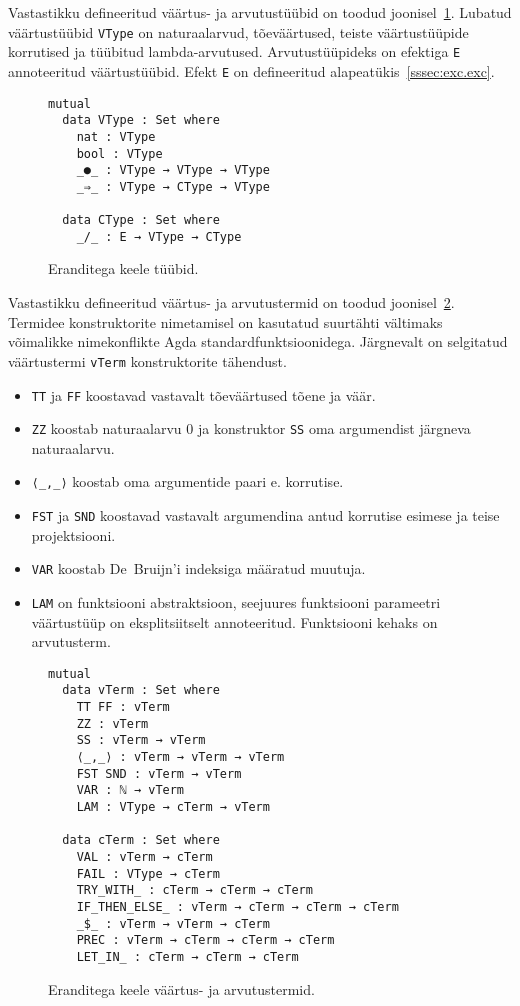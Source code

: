\documentclass[a4paper,12pt]{article}
\begin{document}
Vastastikku defineeritud väärtus- ja arvutustüübid on toodud joonisel~\ref{fig:exc.types}.
Lubatud väärtustüübid {\tt VType} on naturaalarvud, tõeväärtused, teiste väärtustüüpide korrutised ja tüübitud lambda-arvutused.
Arvutustüüpideks on efektiga {\tt E} annoteeritud väärtustüübid. Efekt {\tt E} on defineeritud alapeatükis~\ref{sssec:exc.exc}.
\begin{figure}
  \begin{BVerbatim}
mutual
  data VType : Set where
    nat : VType
    bool : VType
    _●_ : VType → VType → VType
    _⇒_ : VType → CType → VType

  data CType : Set where
    _/_ : E → VType → CType
  \end{BVerbatim}
  \caption{Eranditega keele tüübid.}
  \label{fig:exc.types}
\end{figure}


Vastastikku defineeritud väärtus- ja arvutustermid on toodud joonisel~\ref{fig:exc.raw}.
Termidee konstruktorite nimetamisel on kasutatud suurtähti vältimaks võimalikke nimekonflikte Agda standardfunktsioonidega.
Järgnevalt on selgitatud väärtustermi {\tt vTerm} konstruktorite tähendust.
\begin{itemize}
\item {\tt TT} ja {\tt FF} koostavad vastavalt tõeväärtused tõene ja väär.
\item {\tt ZZ} koostab naturaalarvu 0 ja konstruktor {\tt SS} oma argumendist järgneva naturaalarvu.
\item {\tt ⟨_,_⟩} koostab oma argumentide paari e. korrutise.
\item {\tt FST} ja {\tt SND} koostavad vastavalt argumendina antud korrutise esimese ja teise projektsiooni.
\item {\tt VAR} koostab De~Bruijn'i indeksiga määratud muutuja.
\item {\tt LAM} on funktsiooni abstraktsioon, seejuures funktsiooni parameetri väärtustüüp on eksplitsiitselt annoteeritud. Funktsiooni kehaks on arvutusterm.
\end{itemize}
\begin{figure}
  \begin{BVerbatim}
mutual
  data vTerm : Set where
    TT FF : vTerm
    ZZ : vTerm
    SS : vTerm → vTerm
    ⟨_,_⟩ : vTerm → vTerm → vTerm
    FST SND : vTerm → vTerm
    VAR : ℕ → vTerm
    LAM : VType → cTerm → vTerm

  data cTerm : Set where
    VAL : vTerm → cTerm
    FAIL : VType → cTerm
    TRY_WITH_ : cTerm → cTerm → cTerm
    IF_THEN_ELSE_ : vTerm → cTerm → cTerm → cTerm
    _$_ : vTerm → vTerm → cTerm
    PREC : vTerm → cTerm → cTerm → cTerm
    LET_IN_ : cTerm → cTerm → cTerm
  \end{BVerbatim}
  \caption{Eranditega keele väärtus- ja arvutustermid.}
  \label{fig:exc.raw}
\end{figure}
\end{document}
